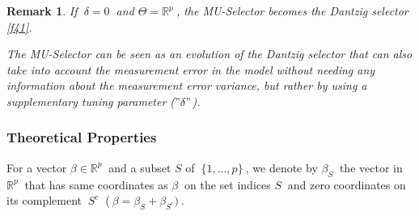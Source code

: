\documentclass[12pt]{report}
\newtheorem{remarque}{Remark}[section]
\begin{document}
 \begin{remarque}
 	If $\ \delta=0\ $ and $\Theta=\mathbb{R}^{p}\ $, the MU-Selector becomes the Dantzig selector \eqref{f41}.
 	
 	The MU-Selector can be seen as an evolution of the Dantzig selector that can also take into account the measurement error in the model without needing any information about the measurement error variance, but rather by using a supplementary tuning parameter ($"\delta"$).
 \end{remarque}
\begin{center}
	\subsubsection{Theoretical Properties}
\end{center}
For a vector $\beta\in \mathbb{R}^{p}\ $ and a subset $S$ of $\ \{1,\dots,p\}\ $, we denote by $\beta_{S}\ $ the vector in $\mathbb{R}^{p}\ $ that has same coordinates as $\beta\ $ on the set indices $S\ $ and zero coordinates on its complement $\ S^{c}\ $ ($\ \beta=\beta_{S}+\beta_{S^{c}})\ $.
\end{document}
